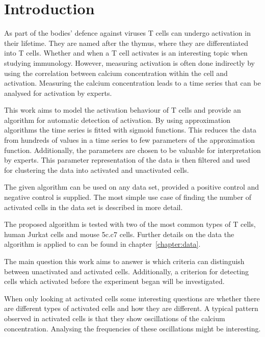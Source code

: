 \chapter{Introduction}
\label{chapter:introduction}

As part of the bodies' defence against viruses T cells can undergo activation in their lifetime. They are named after the thymus, where they are differentiated into T cells. Whether and when a T cell activates is an interesting topic when studying immunology. However, measuring activation is often done indirectly by using the correlation between calcium concentration within the cell and activation. Measuring the calcium concentration leads to a time series that can be analysed for activation by experts.

This work aims to model the activation behaviour of T cells and provide an algorithm for automatic detection of activation. By using approximation algorithms the time series is fitted with sigmoid functions. This reduces the data from hundreds of values in a time series to few parameters of the approximation function. Additionally, the parameters are chosen to be valuable for interpretation by experts. This parameter representation of the data is then filtered and used for clustering the data into activated and unactivated cells.

The given algorithm can be used on any data set, provided a positive control and negative control is supplied. The most simple use case of finding the number of activated cells in the data set is described in more detail.

The proposed algorithm is tested with two of the most common types of T cells, human Jurkat cells and mouse 5c.c7 cells. Further details on the data the algorithm is applied to can be found in chapter~\ref{chapter:data}.

\vspace*{0.7cm}
\noindent
The main question this work aims to answer is which criteria can distinguish between unactivated and activated cells. Additionally, a criterion for detecting cells which activated before the experiment began will be investigated.

When only looking at activated cells some interesting questions are whether there are different types of activated cells and how they are different. A typical pattern observed in activated cells is that they show oscillations of the calcium concentration. Analysing the frequencies of these oscillations might be interesting.

